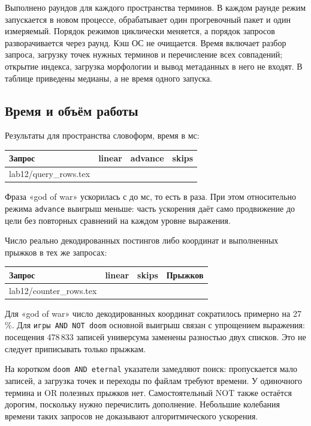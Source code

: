 \documentclass[12pt,a4paper]{article}
\makeatletter
\newcommand{\inputrows}[1]{\@@input #1 }
\makeatother
\begin{document}
Выполнено \LabTwelveRepeats{} раундов для каждого пространства терминов.
В каждом раунде режим запускается в новом процессе, обрабатывает один
прогревочный пакет и один измеряемый. Порядок режимов циклически меняется,
а порядок запросов разворачивается через раунд. Кэш ОС не очищается.
Время включает разбор запроса, загрузку точек нужных терминов и перечисление
всех совпадений; открытие индекса, загрузка морфологии и вывод метаданных
в него не входят. В таблице приведены медианы, а не время одного запуска.

\subsection{Время и объём работы}
Результаты для пространства словоформ, время в мс:
\begin{center}
\small
\begin{tabular}{@{}lrrr@{}}
\toprule
Запрос & linear & advance & skips\\
\midrule
\inputrows{lab12/query_rows.tex}
\bottomrule
\end{tabular}
\end{center}
Фраза «god of war» ускорилась с \LabTwelveGodLinear{} до
\LabTwelveGodSkips{} мс, то есть в \LabTwelveGodSpeedup{} раза.
При этом относительно режима \texttt{advance} выигрыш меньше:
часть ускорения даёт само продвижение до цели без повторных сравнений
на каждом уровне выражения.

Число реально декодированных постингов либо координат и выполненных
прыжков в тех же запросах:
\begin{center}
\small
\begin{tabular}{@{}lrrr@{}}
\toprule
Запрос & linear & skips & Прыжков\\
\midrule
\inputrows{lab12/counter_rows.tex}
\bottomrule
\end{tabular}
\end{center}
Для «god of war» число декодированных координат сократилось примерно на 27\,\%.
Для \texttt{игры AND NOT doom} основной выигрыш связан с упрощением выражения:
посещения 478\,833 записей универсума заменены разностью двух списков.
Это не следует приписывать только прыжкам.

На коротком \texttt{doom AND eternal} указатели замедляют поиск:
пропускается мало записей, а загрузка точек и переходы по файлам требуют
времени. У одиночного термина и OR полезных прыжков нет.
Самостоятельный NOT также остаётся дорогим, поскольку нужно перечислить
дополнение. Небольшие колебания времени таких запросов не доказывают
алгоритмического ускорения.
\end{document}
